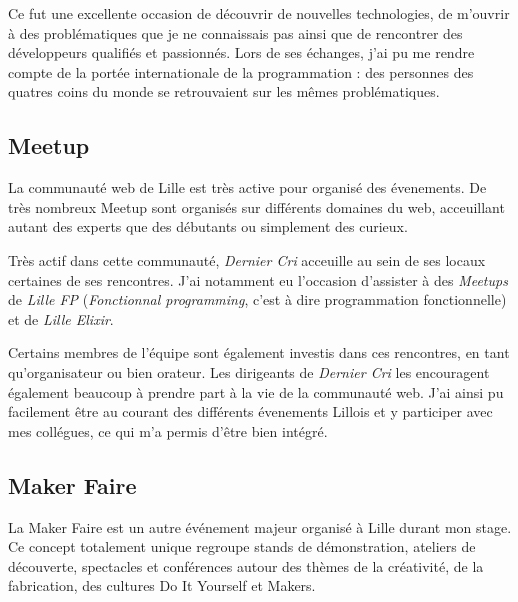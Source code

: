 \documentclass[12pt,a4paper]{article}
\begin{document}
  Ce fut une excellente occasion de découvrir de nouvelles technologies,
  de m'ouvrir à des problématiques que je ne connaissais pas ainsi que de
  rencontrer des développeurs qualifiés et passionnés. Lors de ses
  échanges, j'ai pu me rendre compte de la portée internationale de la
  programmation : des personnes des quatres coins du monde se retrouvaient
  sur les mêmes problématiques.

  \bigskip

  \subsection{Meetup}\label{meetup}

  \bigskip

  La communauté web de Lille est très active pour organisé des évenements.
  De très nombreux Meetup sont organisés sur différents domaines du web,
  acceuillant autant des experts que des débutants ou simplement des
  curieux.

  \bigskip

  Très actif dans cette communauté, \emph{Dernier Cri} acceuille au sein
  de ses locaux certaines de ses rencontres. J'ai notamment eu l'occasion
  d'assister à des \emph{Meetups} de \emph{Lille FP} (\emph{Fonctionnal
  programming}, c'est à dire programmation fonctionnelle) et de
  \emph{Lille Elixir}.

  \bigskip

  Certains membres de l'équipe sont également investis dans ces
  rencontres, en tant qu'organisateur ou bien orateur. Les dirigeants de
  \emph{Dernier Cri} les encouragent également beaucoup à prendre part à
  la vie de la communauté web. J'ai ainsi pu facilement être au courant
  des différents évenements Lillois et y participer avec mes collégues, ce
  qui m'a permis d'être bien intégré.

  \bigskip

  \subsection{Maker Faire}\label{maker-faire}

  \bigskip

  La Maker Faire est un autre événement majeur organisé à Lille durant mon
  stage. Ce concept totalement unique regroupe stands de démonstration,
  ateliers de découverte, spectacles et conférences autour des thèmes de
  la créativité, de la fabrication, des cultures Do It Yourself et Makers.
\end{document}

